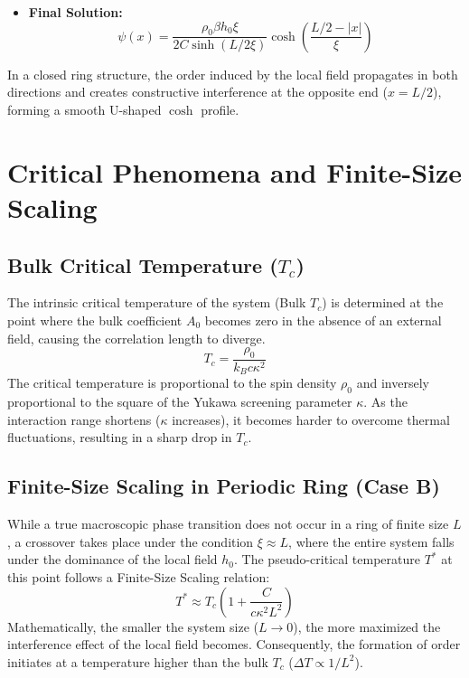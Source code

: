 \documentclass[12pt,a4paper]{article}
\begin{document}
\begin{itemize}
    By symmetry, $\psi'(0^-) = -\psi'(0^+)$. Substituting these into the jump condition:
    \begin{align}
        C \left[ -\frac{D}{\xi} \sinh\left( \frac{L}{2\xi} \right) - \frac{D}{\xi} \sinh\left( \frac{L}{2\xi} \right) \right] &= -\rho_0 \beta h_0 \nonumber \\
        -\frac{2CD}{\xi} \sinh\left( \frac{L}{2\xi} \right) &= -\rho_0 \beta h_0 \nonumber \\
        D &= \frac{\rho_0 \beta h_0 \xi}{2C \sinh(L/2\xi)}
    \end{align}
    \item \textbf{Final Solution:}
    \begin{equation}
        \psi(x) = \frac{\rho_0 \beta h_0 \xi}{2C \sinh(L/2\xi)} \cosh\left( \frac{L/2 - |x|}{\xi} \right)
    \end{equation}
\end{itemize}
In a closed ring structure, the order induced by the local field propagates in both directions and creates constructive interference at the opposite end ($x=L/2$), forming a smooth U-shaped $\cosh$ profile.

\section{Critical Phenomena and Finite-Size Scaling}

\subsection{Bulk Critical Temperature ($T_c$)}
The intrinsic critical temperature of the system (Bulk $T_c$) is determined at the point where the bulk coefficient $A_0$ becomes zero in the absence of an external field, causing the correlation length to diverge.
\begin{equation}
    T_c = \frac{\rho_0}{k_B c \kappa^2}
\end{equation}
The critical temperature is proportional to the spin density $\rho_0$ and inversely proportional to the square of the Yukawa screening parameter $\kappa$. As the interaction range shortens ($\kappa$ increases), it becomes harder to overcome thermal fluctuations, resulting in a sharp drop in $T_c$.

\subsection{Finite-Size Scaling in Periodic Ring (Case B)}
While a true macroscopic phase transition does not occur in a ring of finite size $L$, a crossover takes place under the condition $\xi \approx L$, where the entire system falls under the dominance of the local field $h_0$. The pseudo-critical temperature $T^*$ at this point follows a Finite-Size Scaling relation:
\begin{equation}
    T^* \approx T_c \left( 1 + \frac{C}{c\kappa^2 L^2} \right)
\end{equation}
Mathematically, the smaller the system size ($L \to 0$), the more maximized the interference effect of the local field becomes. Consequently, the formation of order initiates at a temperature higher than the bulk $T_c$ ($\Delta T \propto 1/L^2$).
\end{document}

